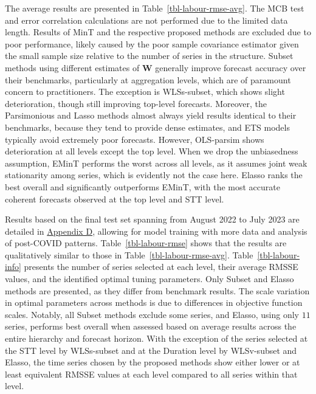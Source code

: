 \documentclass[
  11pt]{article}
\theoremstyle{plain}
\theoremstyle{remark}
\begin{document}
The average results are presented in Table~\ref{tbl-labour-rmse-avg}.
The MCB test and error correlation calculations are not performed due to
the limited data length. Results of MinT and the respective proposed
methods are excluded due to poor performance, likely caused by the poor
sample covariance estimator given the small sample size relative to the
number of series in the structure. Subset methods using different
estimates of \(\bm{W}\)
 generally improve
forecast accuracy over their benchmarks, particularly at aggregation
levels, which are of paramount concern to practitioners. The exception
is WLSs-subset, which shows slight deterioration, though still improving
top-level forecasts. Moreover, the Parsimonious and Lasso methods almost
always yield results identical to their benchmarks, because they tend to
provide dense estimates, and ETS models typically avoid extremely poor
forecasts. However, OLS-parsim shows deterioration at all levels except
the top level. When we drop the unbiasedness assumption, EMinT performs
the worst across all levels, as it assumes joint weak stationarity among
series, which is evidently not the case here. Elasso ranks the best
overall and significantly outperforms EMinT, with the most accurate
coherent forecasts observed at the top level and STT level.

Results based on the final test set spanning from August 2022 to July
2023 are detailed in \hyperref[appendix-labour]{Appendix D}, allowing
for model training with more data and analysis of post-COVID patterns.
Table~\ref{tbl-labour-rmse} shows that the results are qualitatively
similar to those in Table~\ref{tbl-labour-rmse-avg}.
Table~\ref{tbl-labour-info} presents the number of series selected at
each level, their average RMSSE values, and the identified optimal
tuning parameters. Only Subset and Elasso methods are presented, as they
differ from benchmark results. The scale variation in optimal parameters
across methods is due to differences in objective function scales.
Notably, all Subset methods exclude some series, and Elasso, using only
\(11\) series, performs best overall when assessed based on average
results across the entire hierarchy and forecast horizon. With the
exception of the series selected at the STT level by
WLSs-subset
and at the Duration level by WLSv-subset and Elasso, the time series
chosen by the proposed methods show either lower or at least equivalent
RMSSE values at each level compared to all series within that level.
\end{document}
